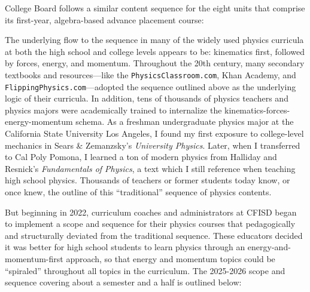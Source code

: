 \documentclass[12pt]{article}
\begin{document}
College Board follows a similar content sequence for the eight units that comprise its first-year, algebra-based advance placement course:

\begin{center}
\end{center}

The underlying flow to the sequence in many of the widely used physics curricula at both the high school and college levels appears to be: kinematics first, followed by forces, energy, and momentum. Throughout the 20th century, many secondary textbooks and resources---like the \texttt{PhysicsClassroom.com}, Khan Academy, and \texttt{FlippingPhysics.com}---adopted the sequence outlined above as the underlying logic of their curricula. In addition, tens of thousands of physics teachers and physics majors were academically trained to internalize the kinematics-forces-energy-momentum schema. As a freshman undergraduate physics major at the California State University Los Angeles, I found my first exposure to college-level mechanics in Sears \& Zemanzsky's \textit{University Physics}. Later, when I transferred to Cal Poly Pomona, I learned a ton of modern physics from Halliday and Resnick's \textit{Fundamentals of Physics}, a text which I still reference when teaching high school physics. Thousands of teachers or former students today know, or once knew, the outline of this ``traditional'' sequence of physics contents.

But beginning in 2022, curriculum coaches and administrators at CFISD began to implement a scope and sequence for their physics courses that pedagogically and structurally deviated from the traditional sequence. These educators decided it was better for high school students to learn physics through an energy-and-momentum-first approach, so that energy and momentum topics could be ``spiraled'' throughout all topics in the curriculum. The 2025-2026 scope and sequence covering about a semester and a half is outlined below:
\end{document}
